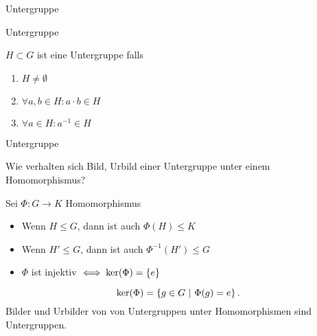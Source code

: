 \documentclass[class=article, crop=false]{standalone}
\begin{document}
\begin{zettel}{Untergruppe}
\begin{flashcard}[gnmbatix]{Untergruppe}
	\begin{definition}[Untergruppe]
		$H \subset G$ ist eine Untergruppe falls
		\begin{enumerate}
			\item $H \neq \emptyset$
			\item $\forall a,b \in  H \colon a \cdot b \in  H$
			\item $\forall a \in  H \colon a^{-1} \in  H$
		\end{enumerate}
	\end{definition}
\end{flashcard}

\begin{flashcard}{Untergruppe}
	\begin{question}
		Wie verhalten sich Bild, Urbild einer Untergruppe unter einem Homomorphismus?
	\end{question}
	\begin{theorem}
		Sei $\Phi: G \longrightarrow K$ Homomorphismus
		\begin{itemize}
			\item Wenn $H \leq  G$, dann ist auch $\Phi(H) \leq K$
			\item Wenn $H' \leq  G$, dann ist auch $\Phi^{-1} (H') \leq G$
			\item $\Phi$ ist injektiv $\iff \ker (\Phi) = \set{e}$
		\end{itemize}
		\[
			\ker (\Phi) = \set{g \in  G}{\Phi(g) = e}
		.\]
		Bilder und Urbilder von von Untergruppen unter Homomorphismen sind Untergruppen.

	\end{theorem}
\end{flashcard}
\end{zettel}
\end{document}
